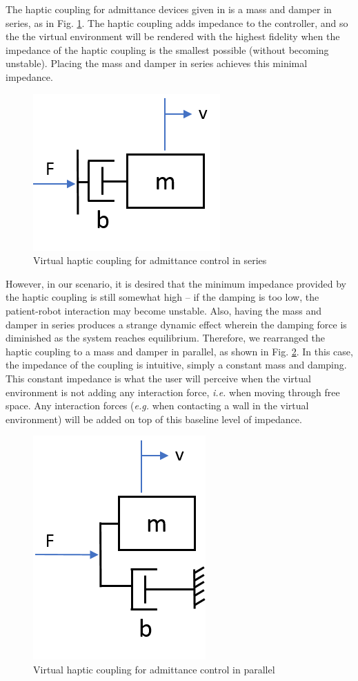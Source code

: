 \documentclass[12pt]{report}
\begin{document}
The haptic coupling for admittance devices given in \cite{Adams1999} is a mass and damper in series, as in Fig. \ref{fig:haptic_coupling_original}. The haptic coupling adds impedance to the controller, and so the the virtual environment will be rendered with the highest fidelity when the impedance of the haptic coupling is the smallest possible (without becoming unstable). Placing the mass and damper in series achieves this minimal impedance.  	

	
	\begin{figure}[h] 
	\centering
\includegraphics[width=0.3\linewidth]{haptic_coupling_original}
		\caption{Virtual haptic coupling for admittance control in series}
		\label{fig:haptic_coupling_original}
	\end{figure} 
	
	However, in our scenario, it is desired that the minimum impedance provided by the haptic coupling is still somewhat high -- if the damping is too low, the patient-robot interaction may become unstable. Also, having the mass and damper in series produces a strange dynamic effect wherein the damping force is diminished as the system reaches equilibrium. Therefore, we rearranged the haptic coupling to a mass and damper in parallel, as shown in Fig. \ref{fig:haptic_coupling}. In this case, the impedance of the coupling is intuitive, simply a constant mass and damping. This constant impedance is what the user will perceive when the virtual environment is not adding any interaction force, \textit{i.e.} when moving through free space. Any interaction forces (\textit{e.g.} when contacting a wall in the virtual environment) will be added on top of this baseline level of impedance. 
	
	\begin{figure}[h] 
		\centering
		\includegraphics[width=0.3\linewidth]{haptic_coupling}
		\caption{Virtual haptic coupling for admittance control in parallel}
		\label{fig:haptic_coupling}
	\end{figure} 
\end{document}
